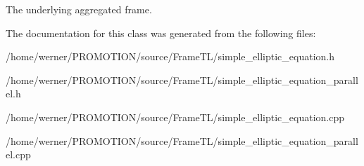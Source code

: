 The underlying aggregated frame. 

The documentation for this class was generated from the following files:\begin{CompactItemize}
\item 
/home/werner/PROMOTION/source/FrameTL/simple\_\-elliptic\_\-equation.h\item 
/home/werner/PROMOTION/source/FrameTL/simple\_\-elliptic\_\-equation\_\-parallel.h\item 
/home/werner/PROMOTION/source/FrameTL/simple\_\-elliptic\_\-equation.cpp\item 
/home/werner/PROMOTION/source/FrameTL/simple\_\-elliptic\_\-equation\_\-parallel.cpp\end{CompactItemize}
